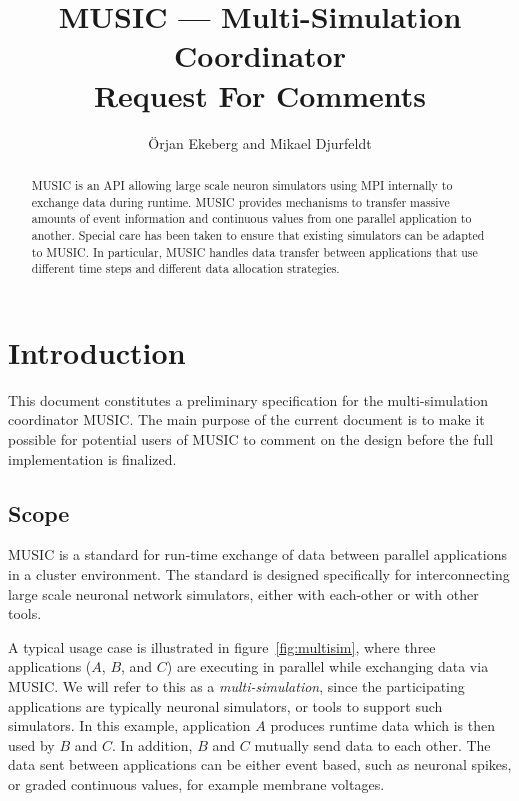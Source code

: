\documentclass[a4paper]{report}
\begin{document}
\lstset{language=C++}

\title{MUSIC --- Multi-Simulation Coordinator\\[2ex]
  Request For Comments\\}

\author{Örjan Ekeberg and Mikael Djurfeldt}

\maketitle

\begin{abstract}
  MUSIC is an API allowing large scale neuron simulators using MPI
  internally to exchange data during runtime.  MUSIC provides
  mechanisms to transfer massive amounts of event information and
  continuous values from one parallel application to another.  Special
  care has been taken to ensure that existing simulators can be
  adapted to MUSIC.  In particular, MUSIC handles data transfer
  between applications that use different time steps and different
  data allocation strategies.
\end{abstract}


\tableofcontents

\listoffigures

\chapter{Introduction}

This document constitutes a preliminary specification for the
multi-simulation coordinator MUSIC.  The main purpose of the current
document is to make it possible for potential users of MUSIC to
comment on the design before the full implementation is finalized.

\section{Scope}

MUSIC is a standard for run-time exchange of data between parallel
applications in a cluster environment.  The standard is designed
specifically for interconnecting large scale neuronal network
simulators, either with each-other or with other tools.

A typical usage case is illustrated in figure~\ref{fig:multisim},
where three applications ($A$, $B$, and $C$) are executing in parallel
while exchanging data via MUSIC.  We will refer to this as a
\emph{multi-simulation}, since the participating applications are
typically neuronal simulators, or tools to support such simulators.
In this example, application $A$ produces runtime data which is then
used by $B$ and $C$.  In addition, $B$ and $C$ mutually send data to
each other.  The data sent between applications can be either event
based, such as neuronal spikes, or graded continuous values, for
example membrane voltages.
\end{document}
